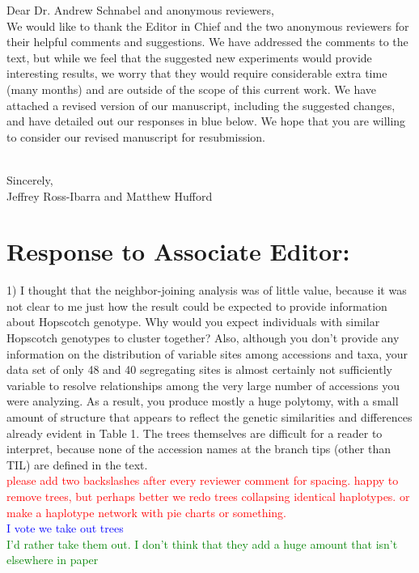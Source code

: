 \documentclass[11pt]{article}
\newcommand{\res}[1]{\noindent \textcolor{blue}{{#1}} \\}
\newcommand{\jri}[1]{\noindent \textcolor{red}{{#1}} \\}
\newcommand{\lev}[1]{\noindent \textcolor{green}{{#1}} \\}
\begin{document}
\noindent Dear Dr. Andrew Schnabel and anonymous reviewers, \\

We would like to thank the Editor in Chief and the two anonymous reviewers for their helpful comments and suggestions. We have addressed the comments to the text, but while we feel that the suggested new experiments would provide interesting results, we worry that they would require considerable extra time (many months) and are outside of the scope of this current work.  We have attached a revised version of our manuscript, including the suggested changes, and have detailed out our responses in blue below. We hope that you are willing to consider our revised manuscript for resubmission.\\\

\noindent Sincerely,\\

Jeffrey Ross-Ibarra and Matthew Hufford

\section*{Response to Associate Editor:}

1) I thought that the neighbor-joining analysis was of little value, because it was not clear to me just how the result could be expected to provide information about Hopscotch genotype.  Why would you expect individuals with similar Hopscotch genotypes to cluster together?  Also, although you don’t provide any information on the distribution of variable sites among accessions and taxa, your data set of only 48 and 40 segregating sites is almost certainly not sufficiently variable to resolve relationships among the very large number of accessions you were analyzing.  As a result, you produce mostly a huge polytomy, with a small amount of structure that appears to reflect the genetic similarities and differences already evident in Table 1.  The trees themselves are difficult for a reader to interpret, because none of the accession names at the branch tips (other than TIL) are defined in the text.\\

\jri{please add two backslashes after every reviewer comment for spacing. happy to remove trees, but perhaps better we redo trees collapsing identical haplotypes. or  make a haplotype network with pie charts or something.}
\res{I vote we take out trees}
\lev{I'd rather take them out. I don't think that they add a huge amount that isn't elsewhere in paper}
\end{document}
